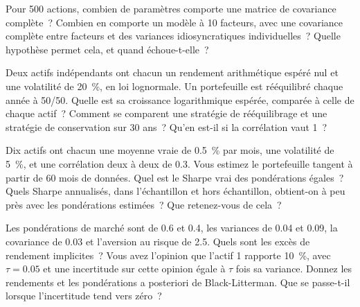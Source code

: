 \begin{question}\label{iq:iv2:portfolio-construction:16}
Pour 500 actions, combien de paramètres comporte une matrice de covariance complète~? Combien en comporte un modèle à 10 facteurs, avec une covariance complète entre facteurs et des variances idiosyncratiques individuelles~? Quelle hypothèse permet cela, et quand échoue-t-elle~?
\end{question}

\begin{question}\label{iq:iv2:portfolio-construction:17}
Deux actifs indépendants ont chacun un rendement arithmétique espéré nul et une volatilité de 20~\%, en loi lognormale. Un portefeuille est rééquilibré chaque année à 50/50. Quelle est sa croissance logarithmique espérée, comparée à celle de chaque actif~? Comment se comparent une stratégie de rééquilibrage et une stratégie de conservation sur 30 ans~? Qu'en est-il si la corrélation vaut 1~?
\end{question}

\begin{question}\label{iq:iv2:portfolio-construction:18}
Dix actifs ont chacun une moyenne vraie de 0.5~\% par mois, une volatilité de 5~\%, et une corrélation deux à deux de 0.3. Vous estimez le portefeuille tangent à partir de 60 mois de données. Quel est le Sharpe vrai des pondérations égales~? Quels Sharpe annualisés, dans l'échantillon et hors échantillon, obtient-on à peu près avec les pondérations estimées~? Que retenez-vous de cela~?
\end{question}

\begin{question}\label{iq:iv2:portfolio-construction:19}
Les pondérations de marché sont de 0.6 et 0.4, les variances de 0.04 et 0.09, la covariance de 0.03 et l'aversion au risque de 2.5. Quels sont les excès de rendement implicites~? Vous avez l'opinion que l'actif 1 rapporte 10~\%, avec $\tau = 0.05$ et une incertitude sur cette opinion égale à $\tau$ fois sa variance. Donnez les rendements et les pondérations a posteriori de Black-Litterman. Que se passe-t-il lorsque l'incertitude tend vers zéro~?
\end{question}

